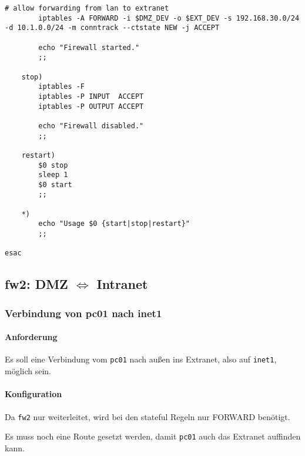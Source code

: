 \begin{lstlisting}[label=lst:masq,caption={Masquerading.}]
        # allow forwarding from lan to extranet
        iptables -A FORWARD -i $DMZ_DEV -o $EXT_DEV -s 192.168.30.0/24 -d 10.1.0.0/24 -m conntrack --ctstate NEW -j ACCEPT

        echo "Firewall started."
        ;;

    stop)
        iptables -F
        iptables -P INPUT  ACCEPT
        iptables -P OUTPUT ACCEPT

        echo "Firewall disabled."
        ;;

    restart)
        $0 stop
        sleep 1
        $0 start
        ;;

    *)
        echo "Usage $0 {start|stop|restart}"
        ;;

esac
\end{lstlisting}

\subsection{fw2: DMZ $\Longleftrightarrow$ Intranet}

\subsubsection{Verbindung von pc01 nach inet1}

\paragraph{Anforderung} Es soll eine Verbindung vom {\tt pc01} nach
außen ins Extranet, also auf {\tt inet1}, möglich sein.


\paragraph{Konfiguration}

Da {\tt fw2} nur weiterleitet, wird bei den stateful
Regeln nur FORWARD benötigt.

Es muss noch eine Route gesetzt werden, damit {\tt pc01} auch das Extranet
auffinden kann.

